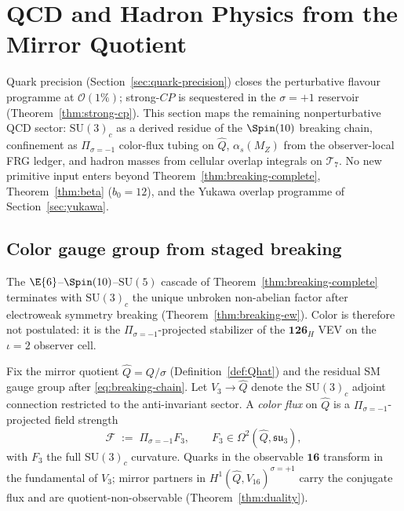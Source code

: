 \section{QCD and Hadron Physics from the Mirror Quotient}
\label{sec:qcd}

Quark precision (Section~\ref{sec:quark-precision}) closes the perturbative
flavour programme at $\mathcal{O}(1\%)$; strong-$CP$ is sequestered in the
$\sigma=+1$ reservoir (Theorem~\ref{thm:strong-cp}). This section maps the
remaining nonperturbative QCD sector: $\mathrm{SU}(3)_c$ as a derived residue
of the $\Spin(10)$ breaking chain, confinement as $\Pi_{\sigma=-1}$ color-flux
tubing on $\hat Q$, $\alpha_s(M_Z)$ from the observer-local FRG ledger, and
hadron masses from cellular overlap integrals on $\mathcal{T}_7$. No new
primitive input enters beyond Theorem~\ref{thm:breaking-complete},
Theorem~\ref{thm:beta} ($b_0=12$), and the Yukawa overlap programme of
Section~\ref{sec:yukawa}.

\subsection{Color gauge group from staged breaking}
\label{sec:qcd:derived}

The $\E{6}$--$\Spin(10)$--$\mathrm{SU}(5)$ cascade of
Theorem~\ref{thm:breaking-complete} terminates with $\mathrm{SU}(3)_c$ the
unique unbroken non-abelian factor after electroweak symmetry breaking
(Theorem~\ref{thm:breaking-ew}). Color is therefore not postulated: it is the
$\Pi_{\sigma=-1}$-projected stabilizer of the $\mathbf{126}_H$ VEV on the
$\iota=2$ observer cell.

\begin{definition}\label{def:color-bundle}
Fix the mirror quotient $\hat Q=Q/\sigma$ (Definition~\ref{def:Qhat}) and
the residual SM gauge group after \eqref{eq:breaking-chain}. Let
$V_3\to\hat Q$ denote the $\mathrm{SU}(3)_c$ adjoint connection restricted to
the anti-invariant sector. A \emph{color flux} on $\hat Q$ is a
$\Pi_{\sigma=-1}$-projected field strength
\begin{equation}\label{eq:color-flux}
  \mathcal{F}
  \;:=\;
  \Pi_{\sigma=-1} F_3,
  \qquad
  F_3 \in \Omega^2(\hat Q, \mathfrak{su}_3),
\end{equation}
with $F_3$ the full $\mathrm{SU}(3)_c$ curvature. Quarks in the observable
$\mathbf{16}$ transform in the fundamental of $V_3$; mirror partners in
$H^1(\hat Q,V_{16})^{\sigma=+1}$ carry the conjugate flux and are
quotient-non-observable (Theorem~\ref{thm:duality}).
\end{definition}


